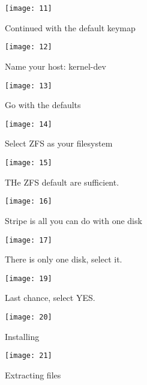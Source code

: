 \begin{figure}
  \centering
\texttt{[image: 11]}
  \caption{Continued with the default keymap}
  \label{fig:utm-fbsd-keymap}
\end{figure}

\begin{figure}
  \centering
\texttt{[image: 12]}
  \caption{Name your host: kernel-dev}
  \label{fig:utm-fbsd-name}
\end{figure}

\begin{figure}
  \centering
\texttt{[image: 13]}
  \caption{Go with the defaults}
  \label{fig:utm-fbsd-components}
\end{figure}

\begin{figure}
  \centering
\texttt{[image: 14]}
  \caption{Select ZFS as your filesystem}
  \label{fig:utm-fbsd-zfs}
\end{figure}

\begin{figure}
  \centering
\texttt{[image: 15]}
  \caption{THe ZFS default are sufficient.}
  \label{fig:utm-fbsd-zfs-defaults}
\end{figure}

\begin{figure}
  \centering
\texttt{[image: 16]}
  \caption{Stripe is all you can do with one disk}
  \label{fig:utm-fbsd-stripe}
\end{figure}

\begin{figure}
  \centering
\texttt{[image: 17]}
  \caption{There is only one disk, select it.}
  \label{fig:utm-fbsd-disk}
\end{figure}

\begin{figure}
  \centering
\texttt{[image: 19]}
  \caption{Last chance, select YES.}
  \label{fig:utm-fbsd-last}
\end{figure}

\begin{figure}
  \centering
\texttt{[image: 20]}
  \caption{Installing}
  \label{fig:utm-fbsd-installing}
\end{figure}

\begin{figure}
  \centering
\texttt{[image: 21]}
  \caption{Extracting files}
  \label{fig:utm-fbsd-extractin}
\end{figure}

